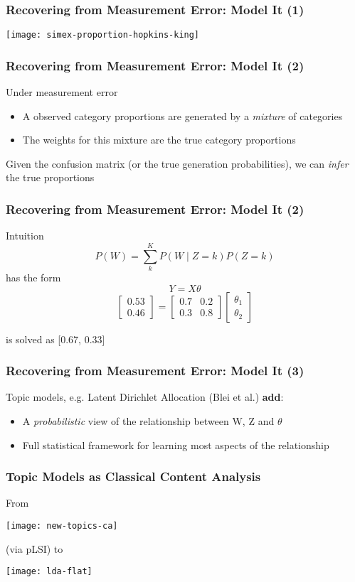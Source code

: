 \documentclass[11pt,compress,professionalfonts]{beamer}
\newcommand{\ita}{\begin{itemize}}
\newcommand{\itm}{\item[]}
\newcommand{\itz}{\end{itemize}}
\begin{document}
\begin{frame}[t,fragile]\frametitle{Recovering from Measurement Error: Model It (1)}

\centerline{\texttt{[image: simex-proportion-hopkins-king]}}

\end{frame}
\begin{frame}[t,fragile]\frametitle{Recovering from Measurement Error: Model It (2)}

Under measurement error
\ita
\itm A observed category proportions are generated by a \textit{mixture} of categories
\itm The weights for this mixture are the true category proportions
\itz
Given the confusion matrix (or the true generation probabilities), we can \textit{infer} the true proportions

\end{frame}
\begin{frame}[t,fragile]\frametitle{Recovering from Measurement Error: Model It (2)}

Intuition
\[
{P(W)} = \sum^K_k {P(W \mid Z=k)} P(Z=k)
\]
has the form
\[
Y = X\theta
\]
\[
\left[\begin{array}{c}0.53 \\0.46\end{array}\right] =
\left[\begin{array}{cc}0.7 & 0.2 \\0.3 & 0.8\end{array}\right] \left[\begin{array}{c}\theta_1 \\\theta_2\end{array}\right]
\]

is solved as [0.67, 0.33]

\end{frame}
\begin{frame}[t,fragile]\frametitle{Recovering from Measurement Error: Model It (3)}

Topic models, e.g. Latent Dirichlet Allocation (Blei et al.) \textbf{add}:
\ita
\itm A \textit{probabilistic} view of the relationship between W, Z and $\theta$
\itm Full statistical framework for learning most aspects of the relationship
\itz

\end{frame}
\begin{frame}[t,fragile]\frametitle{Topic Models as Classical Content Analysis}

From

\centerline{\texttt{[image: new-topics-ca]}}

(via pLSI) to

\centerline{\texttt{[image: lda-flat]}}

\end{frame}
\end{document}
